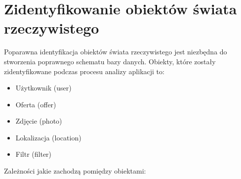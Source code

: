 \section{Zidentyfikowanie obiektów świata rzeczywistego}
Poparawna identyfikacja obiektów świata rzeczywistego jest niezbędna do stworzenia poprawnego schematu bazy danych. Obiekty, które zostały zidentyfikowane podczas procesu analizy aplikacji to:
\begin{itemize}
\item Użytkownik (user)
\item Oferta (offer)
\item Zdjęcie (photo)
\item Lokalizacja (location)
\item Filtr (filter)
\end{itemize}
Zależności jakie zachodzą pomiędzy obiektami:\\
\noindent
\begin{minipage}{\linewidth}
\label{erd}
\end{minipage}
